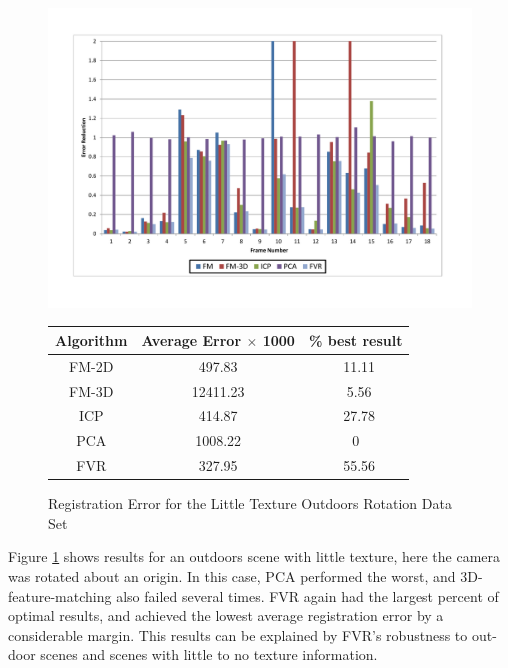 \begin{figure}
\centering
\includegraphics[width=6in]{images/results/Outside_No_Texture_Rotation}
\caption{Registration Error for the Little Texture Outdoors Rotation Data Set}
\label{fig:PET13}

\begin{tabular}{ccc}
\hline
\textbf{Algorithm} & \textbf{Average Error $\times$ 1000} & \textbf{\% best result}\\ \hline
FM-2D	& 497.83 & ~11.11\\
FM-3D	& 12411.23 & ~5.56\\
ICP		& 414.87 & ~27.78\\
PCA		& 1008.22 & 0\\
FVR		& 327.95 & ~55.56\\
\end{tabular}
\end{figure} 


Figure \ref{fig:PET13} shows results for an outdoors scene with little texture, here the camera was rotated about an origin. In this case, PCA performed the worst, and 3D-feature-matching also failed several times. FVR again had the largest percent of optimal results, and achieved the lowest average registration error by a considerable margin. This results can be explained by FVR's robustness to out-door scenes and scenes with little to no texture information.  \\


